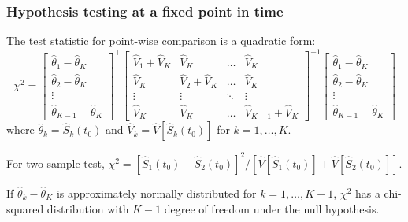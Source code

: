 \documentclass[11pt, aspectratio = 169]{beamer}
\begin{document}
\begin{frame}
  \frametitle{Hypothesis testing at a fixed point in time}
  The test statistic for point-wise comparison is a quadratic form\footnotemark:
  \begin{equation*}
    \chi^2 = 
    \begin{bmatrix}
      \hat{\theta}_1 - \hat{\theta}_K \\
      \hat{\theta}_2 - \hat{\theta}_K \\
      \vdots\\
      \hat{\theta}_{K - 1} - \hat{\theta}_K
    \end{bmatrix}^\top
    \begin{bmatrix}
      \hat{V}_1 + \hat{V}_K & \hat{V}_K & \dots & \hat{V}_K \\
      \hat{V}_K & \hat{V}_2 + \hat{V}_K & \dots & \hat{V}_K \\
      \vdots & \vdots & \ddots & \vdots \\
      \hat{V}_K & \hat{V}_K & \dots & \hat{V}_{K - 1} + \hat{V}_K
    \end{bmatrix}^{-1}
    \begin{bmatrix}
      \hat{\theta}_1 - \hat{\theta}_K \\
      \hat{\theta}_2 - \hat{\theta}_K \\
      \vdots\\
      \hat{\theta}_{K - 1} - \hat{\theta}_K
    \end{bmatrix}
  \end{equation*}
  where $\hat{\theta}_k = \hat{S}_k(t_0)$ and $\hat{V}_k = \hat{V}\left[\hat{S}_k(t_0)\right]$ for $k = 1,\dotsc,K$.

  For two-sample test, $\chi^2 = \left[\hat{S}_1(t_0) - \hat{S}_2(t_0)\right]^2 / \left[\hat{V}\left[\hat{S}_1(t_0)\right] + \hat{V}\left[\hat{S}_2(t_0)\right]\right]$.

  If $\hat{\theta}_k - \hat{\theta}_K$ is approximately normally distributed for $k = 1,\dotsc,K - 1$, $\chi^2$ has a chi-squared distribution with $K - 1$ degree of freedom under the null hypothesis.

\end{frame}
\end{document}
